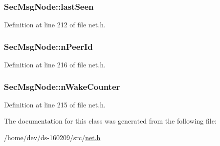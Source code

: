 \subsubsection[{last\+Seen}]{ Sec\+Msg\+Node\+::last\+Seen}\label{class_sec_msg_node_a3a2e08f929788ebfb517218788e29836}


Definition at line 212 of file net.\+h.

\hypertarget{class_sec_msg_node_a325228e72957728b80d299001e831480}{}
\subsubsection[{n\+Peer\+Id}]{ Sec\+Msg\+Node\+::n\+Peer\+Id}\label{class_sec_msg_node_a325228e72957728b80d299001e831480}


Definition at line 216 of file net.\+h.

\hypertarget{class_sec_msg_node_a72aad5e6551e9c79fac326a2a2806844}{}
\subsubsection[{n\+Wake\+Counter}]{ Sec\+Msg\+Node\+::n\+Wake\+Counter}\label{class_sec_msg_node_a72aad5e6551e9c79fac326a2a2806844}


Definition at line 215 of file net.\+h.



The documentation for this class was generated from the following file\+:\begin{DoxyCompactItemize}
\item 
/home/dev/ds-\/160209/src/\hyperlink{net_8h}{net.\+h}\end{DoxyCompactItemize}

